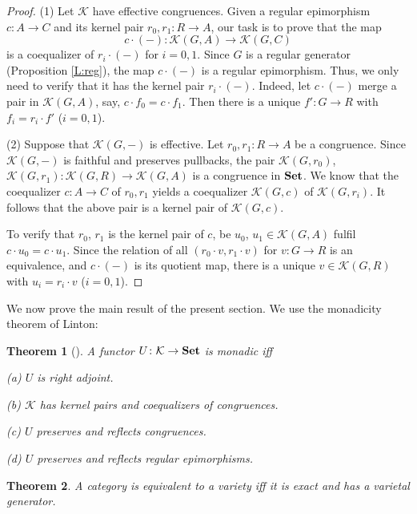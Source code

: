 \documentclass[12pt,amstex,leqno]{amsart}
\newcommand\Set{\operatorname{\bf Set}}
\newcommand\ck{\mathcal {K}}
\newtheorem{theorem}{Theorem}[section]
\theoremstyle{definition}
\numberwithin{equation}{section}
\begin{document}
\begin{proof}
(1) Let $\ck$ have effective congruences. Given a regular epimorphism $c\colon A\to C$ and  its kernel pair $r_0, r_1\colon R\to A$, our task is to prove that the map
$$
c\cdot(-) \colon \ck(G,A) \to \ck (G,C)
$$ 
is a coequalizer of $r_i \cdot (-)$ for $i=0,1$. Since $G$ is a regular generator (Proposition \ref{L:reg}), the map $c\cdot (-)$ is a regular epimorphism. Thus, we only need to verify that it has the kernel pair $r_i\cdot(-)$. Indeed, let $c\cdot(-)$ merge a pair in $\ck(G, A)$, say, $c\cdot f_0 = c\cdot f_1$. Then there is a unique $f'\colon G\to R$ with $f_i = r_i \cdot f'$ ($i=0,1$).

\vskip 1mm
(2) Suppose that $\ck (G, -)$ is effective. Let $r_0, r_1\colon R\to A$ be a congruence. Since $\ck(G,-)$ is faithful and preserves pullbacks, the pair  $\ck(G, r_0)$, $\ck(G, r_1)\colon \ck(G,R) \to \ck(G,A)$ is a congruence in $\Set$. We know that the coequalizer $c\colon A\to C $ of $r_0, r_1$ yields a coequalizer $\ck(G,c)$ of $\ck(G, r_i)$. It follows that the above  pair  is a kernel pair of $\ck(G,c)$.

To verify that $r_0$, $r_1$ is the kernel pair of $c$,  be $u_0$, $u_1 \in \ck(G,A)$ fulfil $c\cdot u_0 = c\cdot u_1$. Since the relation  of all $(r_0 \cdot v, r_1 \cdot v)$ for $v \colon G \to R$ is an equivalence,
and $c \cdot (-)$ is its quotient map, there is a unique $v \in \ck(G,R)$ with $u_i=r_i\cdot v$ ($i=0,1$).
\end{proof}

We now prove the main result of the present section. We use the monadicity theorem of Linton:

\begin{theorem}[{\cite[Prop. 3]{Li}}]\label{T:L}
A functor $U\colon \ck \to \Set$ is monadic iff

{\rm(a)} $U$ is right adjoint.

{\rm(b)} $\ck$ has kernel pairs  and coequalizers of congruences.

{\rm(c)} $U$ preserves and reflects congruences.

{\rm(d)} $U$ preserves and reflects regular epimorphisms.
\end{theorem}

\begin{theorem}\label{T:main}
A category is equivalent to a variety iff it is exact and has a varietal generator.
\end{theorem}
\end{document}
